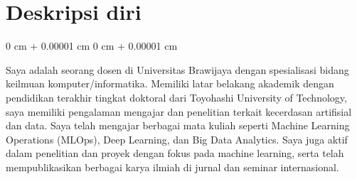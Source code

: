 \documentclass[10pt, letterpaper]{article}
\newenvironment{onecolentry}{
    \begin{adjustwidth}{
        0 cm + 0.00001 cm
    }{
        0 cm + 0.00001 cm
    }
}{
    \end{adjustwidth}
} %
\begin{document}
    \section{Deskripsi diri}

        \begin{onecolentry}
        Saya adalah seorang dosen di Universitas Brawijaya dengan spesialisasi bidang keilmuan komputer/informatika. Memiliki latar belakang akademik dengan pendidikan terakhir tingkat doktoral dari Toyohashi University of Technology, saya memiliki pengalaman mengajar dan penelitian terkait kecerdasan artifisial dan data. Saya telah mengajar berbagai mata kuliah seperti Machine Learning Operations (MLOps), Deep Learning, dan Big Data Analytics. Saya juga aktif dalam penelitian dan proyek dengan fokus pada machine learning, serta telah mempublikasikan berbagai karya ilmiah di jurnal dan seminar internasional.
        \end{onecolentry}

        


    
    
\end{document}

